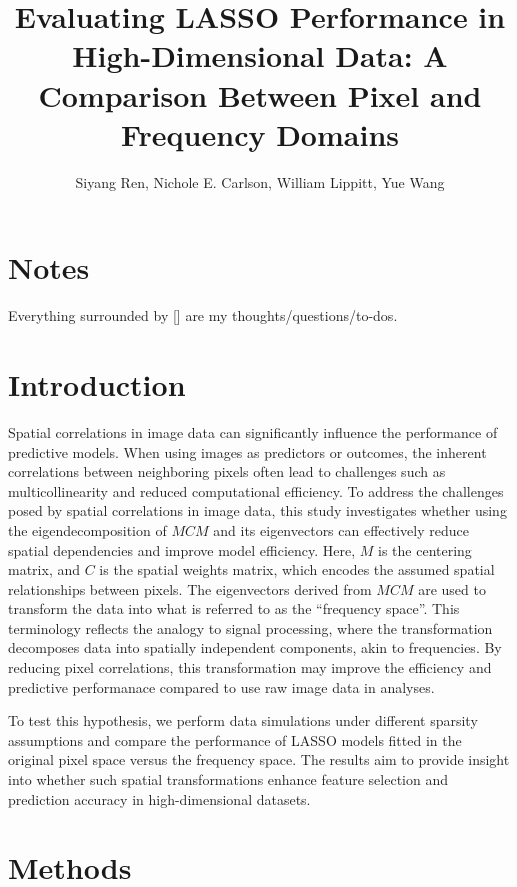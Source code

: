 \documentclass[12pt]{article}
\begin{document}
\title{Evaluating LASSO Performance in High-Dimensional Data: A Comparison Between Pixel and Frequency Domains}
\author{Siyang Ren, Nichole E. Carlson, William Lippitt, Yue Wang}
\date{}
\maketitle


\section*{Notes}

Everything surrounded by [] are my thoughts/questions/to-dos.


\section*{Introduction}

Spatial correlations in image data can significantly influence the performance of predictive models. When using images as predictors or outcomes, the inherent correlations between neighboring pixels often lead to challenges such as multicollinearity and reduced computational efficiency. To address the challenges posed by spatial correlations in image data, this study investigates whether using the eigendecomposition of \( M C M \) and its eigenvectors can effectively reduce spatial dependencies and improve model efficiency. Here, \( M \) is the centering matrix, and \( C \) is the spatial weights matrix, which encodes the assumed spatial relationships between pixels. The eigenvectors derived from \( M C M \) are used to transform the data into what is referred to as the ``frequency space''. This terminology reflects the analogy to signal processing, where the transformation decomposes data into spatially independent components, akin to frequencies. By reducing pixel correlations, this transformation may improve the efficiency and predictive performanace compared to use raw image data in analyses.

To test this hypothesis, we perform data simulations under different sparsity assumptions and compare the performance of LASSO models fitted in the original pixel space versus the frequency space. The results aim to provide insight into whether such spatial transformations enhance feature selection and prediction accuracy in high-dimensional datasets.


\section*{Methods}
\end{document}
